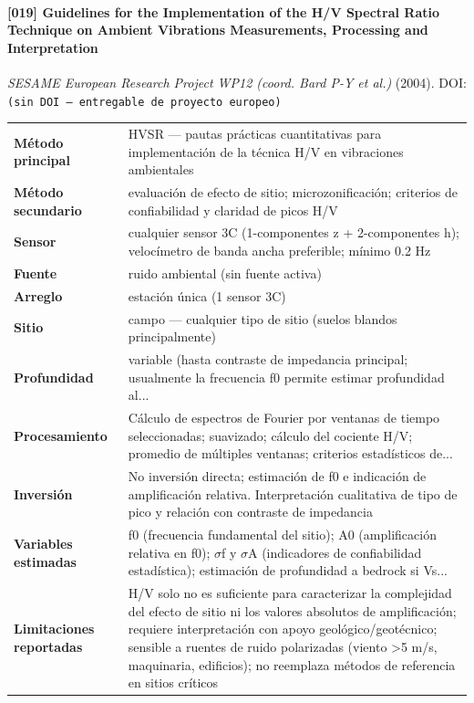 \paragraph{[019] Guidelines for the Implementation of the H/V Spectral Ratio Technique on Ambient Vibrations Measurements, Processing and Interpretation} \emph{SESAME European Research Project WP12 (coord. Bard P-Y et al.)} (2004).
{\scriptsize DOI: \texttt{(sin DOI --- entregable de proyecto europeo)}}

\begin{center}\scriptsize
\begin{tabularx}{\textwidth}{@{}>{\bfseries}p{3.3cm} X@{}}
\toprule
M\'etodo principal & HVSR --- pautas prácticas cuantitativas para implementación de la técnica H/V en vibraciones ambientales \\
M\'etodo secundario & evaluación de efecto de sitio; microzonificación; criterios de confiabilidad y claridad de picos H/V \\
Sensor & cualquier sensor 3C (1-componentes z + 2-componentes h); velocímetro de banda ancha preferible; mínimo 0.2 Hz \\
Fuente & ruido ambiental (sin fuente activa) \\
Arreglo & estación única (1 sensor 3C) \\
Sitio & campo --- cualquier tipo de sitio (suelos blandos principalmente) \\
Profundidad & variable (hasta contraste de impedancia principal; usualmente la frecuencia f0 permite estimar profundidad al... \\
Procesamiento & Cálculo de espectros de Fourier por ventanas de tiempo seleccionadas; suavizado; cálculo del cociente H/V; promedio de múltiples ventanas; criterios estadísticos de... \\
Inversi\'on & No inversión directa; estimación de f0 e indicación de amplificación relativa. Interpretación cualitativa de tipo de pico y relación con contraste de impedancia \\
Variables estimadas & f0 (frecuencia fundamental del sitio); A0 (amplificación relativa en f0); $\sigma$f y $\sigma$A (indicadores de confiabilidad estadística); estimación de profundidad a bedrock si Vs... \\
Limitaciones reportadas & H/V solo no es suficiente para caracterizar la complejidad del efecto de sitio ni los valores absolutos de amplificación; requiere interpretación con apoyo geológico/geotécnico; sensible a ruentes de ruido polarizadas (viento >5 m/s, maquinaria, edificios); no reemplaza métodos de referencia en sitios críticos \\

\end{tabularx}
\end{center}
